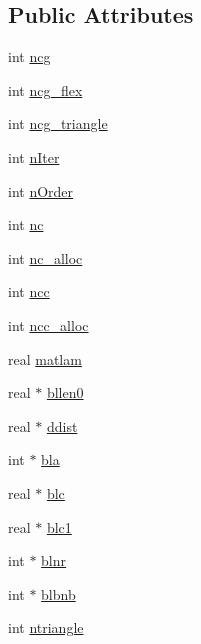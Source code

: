 \subsection*{\-Public \-Attributes}
\begin{DoxyCompactItemize}
\item 
int \hyperlink{structgmx__lincsdata_af21808757a8cc1fa5436abeafc0f95d3}{ncg}
\item 
int \hyperlink{structgmx__lincsdata_a7c544c0b1182cd3378b8b197c152a0a0}{ncg\-\_\-flex}
\item 
int \hyperlink{structgmx__lincsdata_affe0c93c0b470337f68cce06b21603bc}{ncg\-\_\-triangle}
\item 
int \hyperlink{structgmx__lincsdata_adf219ec66e3d97189b936a69040dceed}{n\-Iter}
\item 
int \hyperlink{structgmx__lincsdata_aeb655e3d3cccf2fa947799de86490846}{n\-Order}
\item 
int \hyperlink{structgmx__lincsdata_a357711c56850c9944f755237eb50080c}{nc}
\item 
int \hyperlink{structgmx__lincsdata_a075d1d61c4960bf1cb5c503eb0a0a4a0}{nc\-\_\-alloc}
\item 
int \hyperlink{structgmx__lincsdata_a41af547f08c9ebc10a74159661b59f1a}{ncc}
\item 
int \hyperlink{structgmx__lincsdata_a3a6aa43f1f0e747ea5268187ba2a47a5}{ncc\-\_\-alloc}
\item 
real \hyperlink{structgmx__lincsdata_ad2e1bb64f3d2032d7c3a1288cf9e8658}{matlam}
\item 
real $\ast$ \hyperlink{structgmx__lincsdata_af39e8273f5173d878a965645eabe2657}{bllen0}
\item 
real $\ast$ \hyperlink{structgmx__lincsdata_a1abf337108325233f3a21f86d51ed91c}{ddist}
\item 
int $\ast$ \hyperlink{structgmx__lincsdata_a6a3c465e3d8c24c5d9bd2501653001e6}{bla}
\item 
real $\ast$ \hyperlink{structgmx__lincsdata_ac83ee3577c28addffec3bdec00bb0130}{blc}
\item 
real $\ast$ \hyperlink{structgmx__lincsdata_a8ff4165e7442de72bb76b50a669b3534}{blc1}
\item 
int $\ast$ \hyperlink{structgmx__lincsdata_addc81e7450a3ec0da69367b1b75f70ae}{blnr}
\item 
int $\ast$ \hyperlink{structgmx__lincsdata_a19493d57de0beeee3536487c800de9ed}{blbnb}
\item 
int \hyperlink{structgmx__lincsdata_a653ce3d20c66b63c906f8acbdb6dd9f9}{ntriangle}

\end{DoxyCompactItemize}
